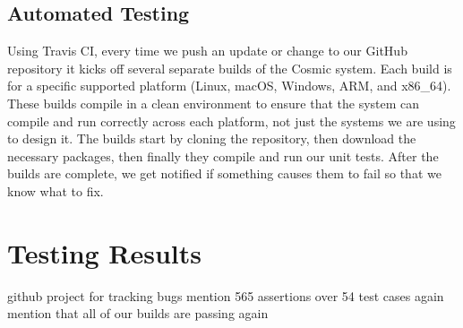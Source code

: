 \documentclass[conference]{IEEEtran}
\begin{document}
\subsection{Automated Testing}
Using Travis CI, every time we push an update or change to our GitHub repository it kicks off several separate builds of the Cosmic system. Each build is for a specific supported platform (Linux, macOS, Windows, ARM, and x86\_64). These builds compile in a clean environment to ensure that the system can compile and run correctly across each platform, not just the systems we are using to design it. The builds start by cloning the repository, then download the necessary packages, then finally they compile and run our unit tests. After the builds are complete, we get notified if something causes them to fail so that we know what to fix.

\section{Testing Results}
github project for tracking bugs
mention 565 assertions over 54 test cases again
mention that all of our builds are passing again
\end{document}
